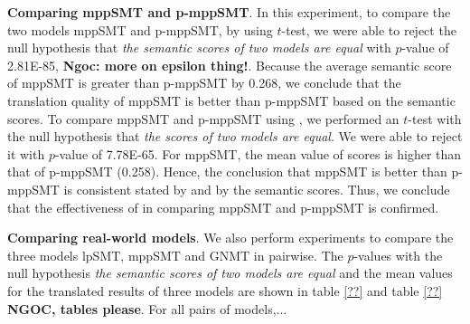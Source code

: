 \textbf{Comparing mppSMT and p-mppSMT}. In this experiment, 
to compare the two models mppSMT and p-mppSMT, by using $t$-test, we
were able to reject the null hypothesis that \textit{the semantic
scores of two models are equal} with $p$-value of 2.81E-85, {\bf Ngoc:
more on epsilon thing!}. Because the average semantic score of mppSMT
is greater than p-mppSMT by 0.268, we conclude that the translation
quality of mppSMT is better than p-mppSMT based on the semantic
scores.
%
To compare mppSMT and p-mppSMT using {\model}, we performed an
$t$-test with the null hypothesis that \textit{the {\model} scores of
two models are equal}. We were able to reject it with $p$-value of
7.78E-65. For mppSMT, the mean value of {\model} scores is higher than
that of p-mppSMT (0.258). Hence, the conclusion that mppSMT is better
than p-mppSMT is consistent stated by {\model} and by the semantic
scores.
Thus, we conclude that the effectiveness of {\model} in comparing
mppSMT and p-mppSMT is confirmed.

\textbf{Comparing real-world models}. We also perform experiments to compare the three models 
lpSMT, mppSMT and GNMT in pairwise. The $p$-values with the null hypothesis \textit{the semantic 
scores of two models are equal} and the mean values for the translated results of three models 
are shown in table \ref{??}  and table \ref{??} \textbf{NGOC, tables please}. For all pairs of models,...

